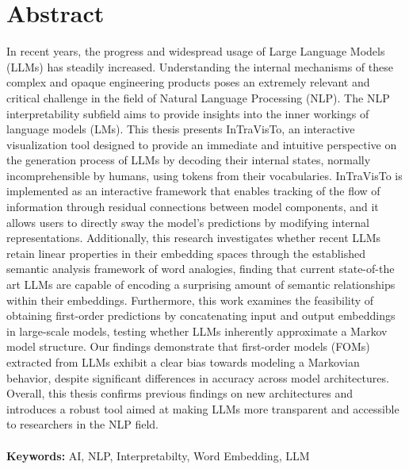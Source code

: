 \documentclass{Configuration_Files/PoliMi3i_thesis}
\begin{document}
\chapter*{Abstract} 
In recent years, the progress and widespread usage of Large Language Models (LLMs) has steadily increased.
Understanding the internal mechanisms of these complex and opaque engineering products poses an extremely relevant and critical challenge in the field of Natural Language Processing (NLP).
The NLP interpretability subfield aims to provide insights into the inner workings of language models (LMs).
This thesis presents InTraVisTo, an interactive visualization tool designed to provide an immediate and intuitive perspective on the generation process of LLMs by decoding their internal states, normally incomprehensible by humans, using tokens from their vocabularies.
InTraVisTo is implemented as an interactive framework that enables tracking of the flow of information through residual connections between model components, and it allows users to directly sway the model's predictions by modifying internal representations.
Additionally, this research investigates whether recent LLMs retain linear properties in their embedding spaces through the established semantic analysis framework of word analogies, finding that current state-of-the art LLMs are capable of encoding a surprising amount of semantic relationships within their embeddings.
Furthermore, this work examines the feasibility of obtaining first-order predictions by concatenating input and output embeddings in large-scale models, testing whether LLMs inherently approximate a Markov model structure.
Our findings demonstrate that first-order models (FOMs) extracted from LLMs exhibit a clear bias towards modeling a Markovian behavior, despite significant differences in accuracy across model architectures.
Overall, this thesis confirms previous findings on new architectures and introduces a robust tool aimed at making LLMs more transparent and accessible to researchers in the NLP field.
\\
\\
\textbf{Keywords:} AI, NLP, Interpretabilty, Word Embedding, LLM

\end{document}
